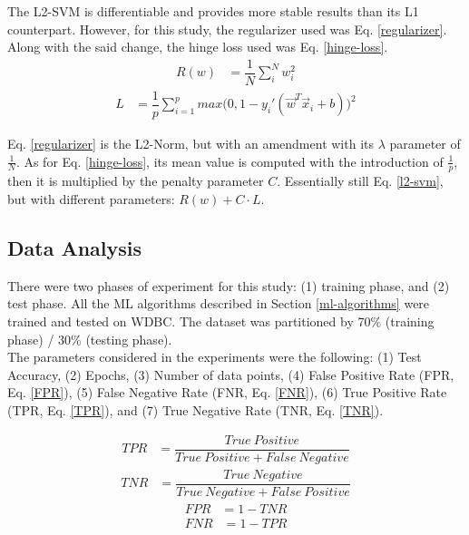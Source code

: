 The L2-SVM is differentiable and provides more stable results than its L1 counterpart\cite{Tang}. However, for this study, the regularizer used was Eq. \ref{regularizer}. Along with the said change, the hinge loss used was Eq. \ref{hinge-loss}.
\begin{align}\label{regularizer}
R(w)	&=	\dfrac{1}{N} \sum_{i}^{N} w_{i}^{2}
\end{align}
\begin{align}\label{hinge-loss}
L	&= \dfrac{1}{p} \sum_{i = 1}^{p} max\big(0, 1 - y_{i}'(\vec{w}^{T}\vec{x}_{i}+b)\big)^{2}
\end{align}

Eq. \ref{regularizer} is the L2-Norm, but with an amendment with its $\lambda$ parameter of $\frac{1}{N}$. As for Eq. \ref{hinge-loss}, its mean value is computed with the introduction of $\frac{1}{p}$, then it is multiplied by the penalty parameter $C$. Essentially still Eq. \ref{l2-svm}, but with different parameters: $R(w) + C \cdot L$.

\subsection{Data Analysis}
There were two phases of experiment for this study: (1) training phase, and (2) test phase. All the ML algorithms described in Section \ref{ml-algorithms} were trained and tested on WDBC. The dataset was partitioned by 70\% (training phase) / 30\% (testing phase).\\
\indent	The parameters considered in the experiments were the following: (1) Test Accuracy, (2) Epochs, (3) Number of data points, (4) False Positive Rate (FPR, Eq. \ref{FPR}), (5) False Negative Rate (FNR, Eq. \ref{FNR}), (6) True Positive Rate (TPR, Eq. \ref{TPR}), and (7) True Negative Rate (TNR, Eq. \ref{TNR}).

\begin{align}\label{TPR}
TPR	&=	\dfrac{True\ Positive}{True\ Positive + False\ Negative}
\end{align}
\begin{align}\label{TNR}
TNR	&=	\dfrac{True\ Negative}{True\ Negative + False\ Positive}
\end{align}
\begin{align}\label{FPR}
FPR	&=	1 - TNR
\end{align}
\begin{align}\label{FNR}
FNR	&=	1 - TPR
\end{align}

